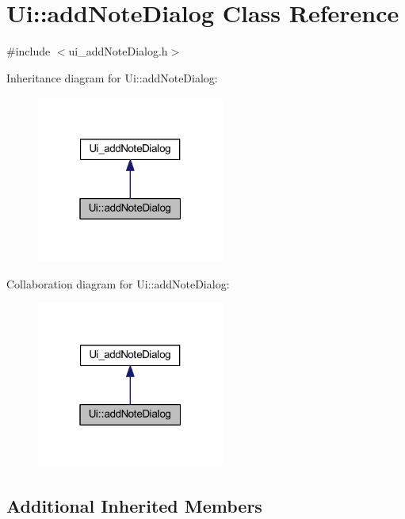\hypertarget{classUi_1_1addNoteDialog}{}\section{Ui\+:\+:add\+Note\+Dialog Class Reference}
\label{classUi_1_1addNoteDialog}


{\ttfamily \#include $<$ui\+\_\+add\+Note\+Dialog.\+h$>$}



Inheritance diagram for Ui\+:\+:add\+Note\+Dialog\+:
\nopagebreak
\begin{figure}[H]
\begin{center}
\leavevmode
\includegraphics[width=175pt]{classUi_1_1addNoteDialog__inherit__graph}
\end{center}
\end{figure}


Collaboration diagram for Ui\+:\+:add\+Note\+Dialog\+:
\nopagebreak
\begin{figure}[H]
\begin{center}
\leavevmode
\includegraphics[width=175pt]{classUi_1_1addNoteDialog__coll__graph}
\end{center}
\end{figure}
\subsection*{Additional Inherited Members}


